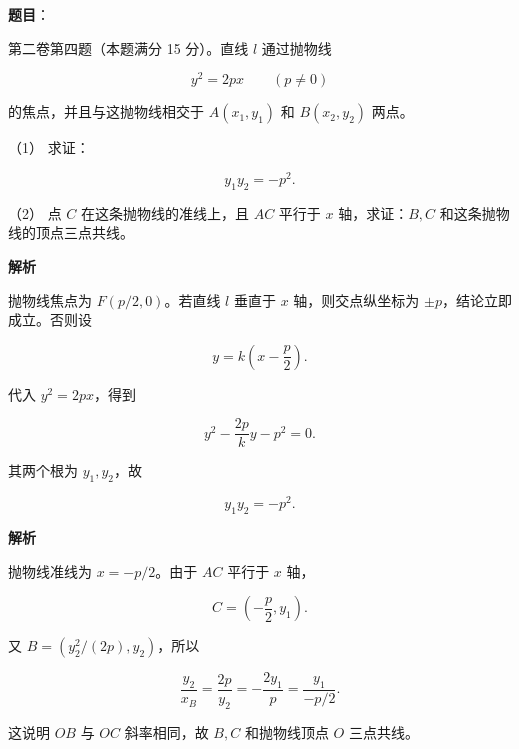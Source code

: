 \begin{answer}

\textbf{题目}：

第二卷第四题（本题满分 15 分）。直线 $l$ 通过抛物线

\nopagebreak[4]
\[
y^2=2px\qquad(p\ne0)
\]

的焦点，并且与这抛物线相交于 $A(x_1,y_1)$ 和 $B(x_2,y_2)$ 两点。

（1） 求证：

\nopagebreak[4]
\[
y_1y_2=-p^2.
\]

（2） 点 $C$ 在这条抛物线的准线上，且 $AC$ 平行于 $x$ 轴，求证：$B,C$ 和这条抛物线的顶点三点共线。

\textbf{解析}


抛物线焦点为 $F(p/2,0)$。若直线 $l$ 垂直于 $x$ 轴，则交点纵坐标为 $\pm p$，结论立即成立。否则设

\nopagebreak[4]
\[
y=k\left(x-\frac p2\right).
\]

代入 $y^2=2px$，得到

\nopagebreak[4]
\[
y^2-\frac{2p}{k}y-p^2=0.
\]

其两个根为 $y_1,y_2$，故

\nopagebreak[4]
\[
y_1y_2=-p^2.
\]


\textbf{解析}

抛物线准线为 $x=-p/2$。由于 $AC$ 平行于 $x$ 轴，

\nopagebreak[4]
\[
C=\left(-\frac p2,y_1\right).
\]

又 $B=(y_2^2/(2p),y_2)$，所以

\nopagebreak[4]
\[
\frac{y_2}{x_B}
=\frac{2p}{y_2}
=-\frac{2y_1}{p}
=\frac{y_1}{-p/2}.
\]

这说明 $OB$ 与 $OC$ 斜率相同，故 $B,C$ 和抛物线顶点 $O$ 三点共线。



\end{answer}
